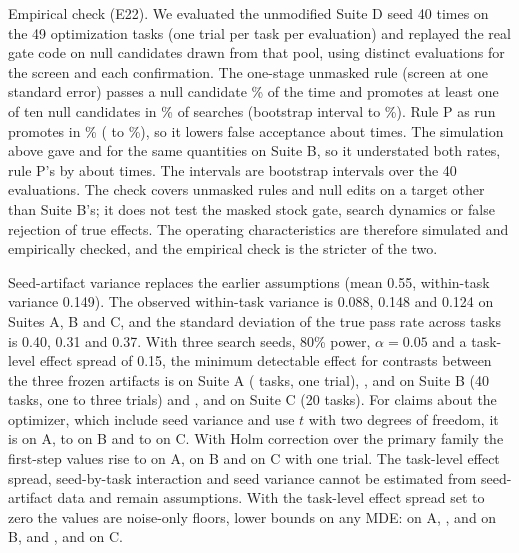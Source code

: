 Empirical check (E22). We evaluated the unmodified Suite D seed 40 times on the 49 optimization tasks (one trial per task per evaluation) and replayed the real gate code on null candidates drawn from that pool, using distinct evaluations for the screen and each confirmation. The one-stage unmasked rule (screen at one standard error) passes a null candidate \nullOneStagePer{}\% of the time and promotes at least one of ten null candidates in \nullOneStageTen{}\% of searches (bootstrap interval \nullOneStageTenLo{} to \nullOneStageTenHi{}\%). Rule P as run promotes in \nullRulePTen{}\% (\nullRulePTenLo{} to \nullRulePTenHi{}\%), so it lowers false acceptance about \nullRatio{} times. The simulation above gave \simKoneFalseB{} and \simPFalseB{} for the same quantities on Suite B, so it understated both rates, rule P's by about \nullSimRatio{} times. The intervals are bootstrap intervals over the 40 evaluations. The check covers unmasked rules and null edits on a target other than Suite B's; it does not test the masked stock gate, search dynamics or false rejection of true effects. The operating characteristics are therefore simulated and empirically checked, and the empirical check is the stricter of the two.

Seed-artifact variance replaces the earlier assumptions (mean 0.55, within-task variance 0.149). The observed within-task variance is 0.088, 0.148 and 0.124 on Suites A, B and C, and the standard deviation of the true pass rate across tasks is 0.40, 0.31 and 0.37. With three search seeds, 80\% power, $\alpha=0.05$ and a task-level effect spread of 0.15, the minimum detectable effect for contrasts between the three frozen artifacts is \mdeACondOne{} on Suite A (\mdeATasks{} tasks, one trial), \mdeBCondOne{}, \mdeBCondTwo{} and \mdeBCondThree{} on Suite B (40 tasks, one to three trials) and \mdeCCondOne{}, \mdeCCondTwo{} and \mdeCCondThree{} on Suite C (20 tasks). For claims about the optimizer, which include seed variance and use $t$ with two degrees of freedom, it is \mdeAPipeOne{} on A, \mdeBPipeOne{} to \mdeBPipeThree{} on B and \mdeCPipeOne{} to \mdeCPipeThree{} on C. With Holm correction over the primary family the first-step values rise to \mdeAHolmOne{} on A, \mdeBHolmOne{} on B and \mdeCHolmOne{} on C with one trial. The task-level effect spread, seed-by-task interaction and seed variance cannot be estimated from seed-artifact data and remain assumptions. With the task-level effect spread set to zero the values are noise-only floors, lower bounds on any MDE: \mdeFloorAOne{} on A, \mdeFloorBOne{}, \mdeFloorBTwo{} and \mdeFloorBThree{} on B, and \mdeFloorCOne{}, \mdeFloorCTwo{} and \mdeFloorCThree{} on C.


